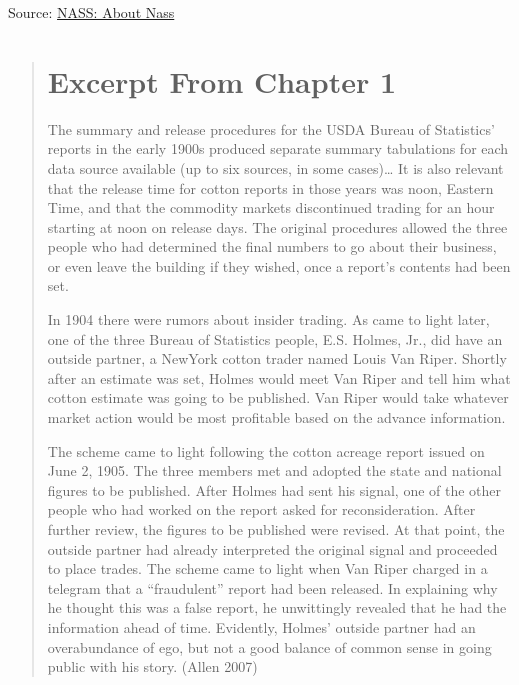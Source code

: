 \documentclass[
  letterpaper,
  DIV=11,
  numbers=noendperiod]{scrreprt}
\begin{document}
Source:
\href{pdf-Readings/safegaurding-americas-agricultural-statistics.pdf}{NASS:
About Nass}

\begin{quote}
\hypertarget{excerpt-from-chapter-1-1}{%
\section{Excerpt From Chapter 1}\label{excerpt-from-chapter-1-1}}

The summary and release procedures for the USDA Bureau of Statistics'
reports in the early 1900s produced separate summary tabulations for
each data source available (up to six sources, in some cases)\ldots{} It
is also relevant that the release time for cotton reports in those years
was noon, Eastern Time, and that the commodity markets discontinued
trading for an hour starting at noon on release days. The original
procedures allowed the three people who had determined the final numbers
to go about their business, or even leave the building if they wished,
once a report's contents had been set.

In 1904 there were rumors about insider trading. As came to light later,
one of the three Bureau of Statistics people, E.S. Holmes, Jr., did have
an outside partner, a NewYork cotton trader named Louis Van Riper.
Shortly after an estimate was set, Holmes would meet Van Riper and tell
him what cotton estimate was going to be published. Van Riper would take
whatever market action would be most profitable based on the advance
information.

The scheme came to light following the cotton acreage report issued on
June 2, 1905. The three members met and adopted the state and national
figures to be published. After Holmes had sent his signal, one of the
other people who had worked on the report asked for reconsideration.
After further review, the figures to be published were revised. At that
point, the outside partner had already interpreted the original signal
and proceeded to place trades. The scheme came to light when Van Riper
charged in a telegram that a ``fraudulent'' report had been released. In
explaining why he thought this was a false report, he unwittingly
revealed that he had the information ahead of time. Evidently, Holmes'
outside partner had an overabundance of ego, but not a good balance of
common sense in going public with his story. (Allen 2007)
\end{quote}
\end{document}
